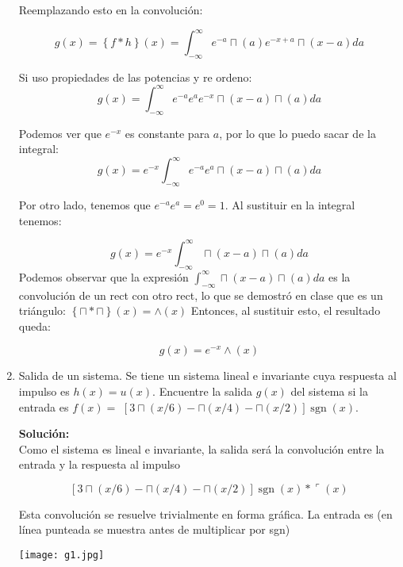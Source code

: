 \documentclass[letterpaper, 12pt]{article}
\newif\ifanswers
\begin{document}
\begin{enumerate}
{    Reemplazando esto en la convolución:
    
    $$
    g(x) = \left\{ f*h\right\}(x) = \int_{-\infty}^{\infty}e^{-a}\sqcap(a)e^{-x+a}\sqcap(x-a)da
    $$
    
    Si uso propiedades de las potencias y re ordeno:
    $$
    g(x) =  \int_{-\infty}^{\infty}e^{-a}e^{a}e^{-x}\sqcap(x-a)\sqcap(a)da
    $$
    
    Podemos ver que $e^{-x}$ es constante para $a$, por lo que lo puedo sacar de la integral:
    $$
    g(x) = e^{-x} \int_{-\infty}^{\infty}e^{-a}e^{a}\sqcap(x-a)\sqcap(a)da
    $$
    
    Por otro lado, tenemos que $e^{-a}e^{a} = e^0 = 1$. Al sustituir en la integral tenemos:
    
    $$
    g(x) = e^{-x} \int_{-\infty}^{\infty}\sqcap(x-a)\sqcap(a)da
    $$
    Podemos observar que la expresión $\int_{-\infty}^{\infty}\sqcap(x-a)\sqcap(a)da$ es la convolución de un rect con otro rect, lo que se demostró en clase que es un triángulo: $\left\{ \sqcap*\sqcap\right\}(x) = \wedge(x)$
    Entonces, al sustituir esto, el resultado queda:
    
    $$
    g(x) = e^{-x} \wedge(x)
    $$

    }

    \fi


    \item Salida de un sistema. Se tiene un sistema lineal e invariante cuya respuesta al impulso es $h(x)=u(x)$. Encuentre la salida $g(x)$ del sistema si la entrada es $f(x)=$ $[3 \sqcap(x / 6)-\sqcap(x / 4)-\sqcap(x / 2)] \operatorname{sgn}(x)$.

    \ifanswers
    {\color{red}
    \textbf{Solución: } 
    \\
    Como el sistema es lineal e invariante, la salida será la convolución entre la entrada y la respuesta al impulso
    
    $$
    [3 \sqcap(x / 6)-\sqcap(x / 4)-\sqcap(x / 2)] \operatorname{sgn}(x) *\ulcorner(x)
    $$
    
    Esta convolución se resuelve trivialmente en forma gráfica. La entrada es (en línea punteada se muestra antes de multiplicar por sgn)
    
    \begin{center}
    \texttt{[image: g1.jpg]}
    \end{center}
    
}
\end{enumerate}
\end{document}
